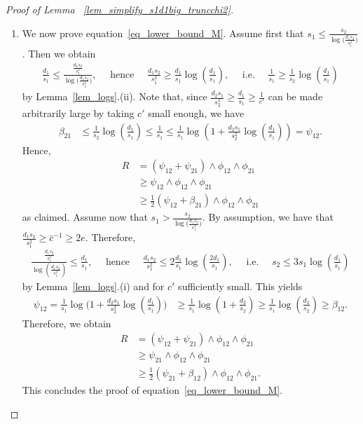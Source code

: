 \documentclass{article}
\theoremstyle{remark}
\begin{document}
\begin{proof}[Proof of Lemma ~\ref{lem_simplify_s1d1big_truncchi2}]
\begin{enumerate}
    \item 
We now prove equation~\eqref{eq_lower_bound_M}. 
Assume first that $s_1 \leq \frac{s_2}{\log\big(\frac{d_1s_2}{s_1^2}\big)}$. 
Then we obtain
\begin{align*}
    \frac{d_1}{s_1} \leq \frac{\frac{d_1s_2}{s_1^2}}{\log\big(\frac{d_1s_2}{s_1^2}\big)},\quad  \text{ hence } \quad \frac{d_1s_2}{s_1^2} \geq \frac{d_1}{s_1} \log\left(\frac{d_1}{s_1}\right), \quad \text{ i.e. } \quad \frac{1}{s_1} \geq \frac{1}{s_2} \log\left(\frac{d_1}{s_1}\right)
\end{align*}
by Lemma~\ref{lem_logs}.(ii). 
Note that, since $\frac{d_2s_1}{s_2^2} \geq \frac{d_1}{s_1} \geq \frac{1}{c'} $ can be made arbitrarily large by taking $c'$ small enough, we have
\begin{align*}
    \beta_{21} &\leq \frac{1}{s_2} \log\left(\frac{d_1}{s_1}\right) \leq \frac{1}{s_1} \leq \frac{1}{s_1}\log\left(1 + \frac{d_2s_1}{s_2^2}\log\left(\frac{d_1}{s_1}\right)\right)  = \psi_{12}.
\end{align*}
Hence,
\begin{align*}
    R &= (\psi_{12} + \psi_{21}) \land \phi_{12} \land \phi_{21} \\
    &\geq \psi_{12}  \land \phi_{12} \land \phi_{21} \\
    &\geq \frac{1}{2}(\psi_{12} + \beta_{21}) \land \phi_{12} \land \phi_{21}
\end{align*}
as claimed.
Assume now that $s_1 > \frac{s_2}{\log\big(\frac{d_1s_2}{s_1^2}\big)}$. 
By assumption, we have that $\frac{d_1s_2}{s_1^2} \geq \bar{c}^{-1} \geq 2e$.
Therefore, 
\begin{align*}
    \frac{\frac{d_1 s_2}{s_1^2}}{\log\left(\frac{d_1 s_2}{s_1^2}\right)}\leq \frac{d_1}{s_1}, \quad  \text{ hence } \quad \frac{d_1 s_2}{s_1^2} \leq 2 \frac{d_1}{s_1} \log\left(\frac{2d_1}{s_1}\right), \quad \text{ i.e. } \quad s_2 \leq 3 s_1 \log\left(\frac{d_1}{s_1}\right)
\end{align*}
by Lemma~\ref{lem_logs}.(i) and for $c'$ sufficiently small.
This yields
\begin{align*}
    \psi_{12} = \frac{1}{s_1} \log\Big(1 +  \frac{d_2s_1}{s_2^2}\log\left(\frac{d_1}{s_1}\right)\Big)
    & \geq \frac{1}{s_1} \log\left(1+\frac{d_2}{s_2}\right)\geq \frac{1}{s_1} \log\left(\frac{d_2}{s_2}\right) \geq \beta_{12}.
\end{align*}
Therefore, we obtain
\begin{align*}
    R &= (\psi_{12} + \psi_{21}) \land \phi_{12} \land \phi_{21} \\
    &\geq \psi_{21}  \land \phi_{12} \land \phi_{21} \\
    &\geq \frac{1}{2}(\psi_{21} + \beta_{12}) \land \phi_{12} \land \phi_{21}.
\end{align*}
This concludes the proof of equation~\eqref{eq_lower_bound_M}.
    \end{enumerate}
\end{proof}
\end{document}
